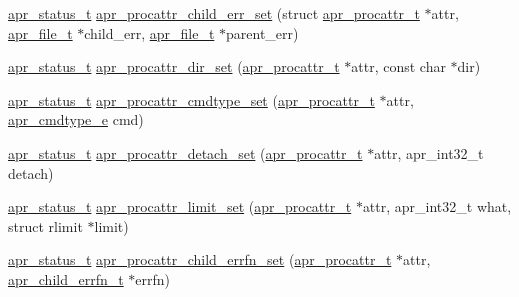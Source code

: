 \begin{DoxyCompactItemize}
\hyperlink{group__apr__errno_gaf76ee4543247e9fb3f3546203e590a6c}{apr\-\_\-status\-\_\-t} \hyperlink{group__apr__thread__proc_ga6fad364c6c820e37c0915435cfb3921f}{apr\-\_\-procattr\-\_\-child\-\_\-err\-\_\-set} (struct \hyperlink{group__apr__thread__proc_ga0d83919a6a0dd609598a864917f8b339}{apr\-\_\-procattr\-\_\-t} $\ast$attr, \hyperlink{group__apr__file__io_gaa46e4763ac375ea3c7a43ba6f6099e22}{apr\-\_\-file\-\_\-t} $\ast$child\-\_\-err, \hyperlink{group__apr__file__io_gaa46e4763ac375ea3c7a43ba6f6099e22}{apr\-\_\-file\-\_\-t} $\ast$parent\-\_\-err)
\item 
\hyperlink{group__apr__errno_gaf76ee4543247e9fb3f3546203e590a6c}{apr\-\_\-status\-\_\-t} \hyperlink{group__apr__thread__proc_ga97766f50b0ae083a2f8a28e698a59baa}{apr\-\_\-procattr\-\_\-dir\-\_\-set} (\hyperlink{group__apr__thread__proc_ga0d83919a6a0dd609598a864917f8b339}{apr\-\_\-procattr\-\_\-t} $\ast$attr, const char $\ast$dir)
\item 
\hyperlink{group__apr__errno_gaf76ee4543247e9fb3f3546203e590a6c}{apr\-\_\-status\-\_\-t} \hyperlink{group__apr__thread__proc_ga1426acc5bdd96385769e7b42bfa6ebbd}{apr\-\_\-procattr\-\_\-cmdtype\-\_\-set} (\hyperlink{group__apr__thread__proc_ga0d83919a6a0dd609598a864917f8b339}{apr\-\_\-procattr\-\_\-t} $\ast$attr, \hyperlink{group__apr__thread__proc_gadcb981d7748c580eb69ac11dbf709060}{apr\-\_\-cmdtype\-\_\-e} cmd)
\item 
\hyperlink{group__apr__errno_gaf76ee4543247e9fb3f3546203e590a6c}{apr\-\_\-status\-\_\-t} \hyperlink{group__apr__thread__proc_ga3ccca55041f648f00f0605673d4e0fdc}{apr\-\_\-procattr\-\_\-detach\-\_\-set} (\hyperlink{group__apr__thread__proc_ga0d83919a6a0dd609598a864917f8b339}{apr\-\_\-procattr\-\_\-t} $\ast$attr, apr\-\_\-int32\-\_\-t detach)
\item 
\hyperlink{group__apr__errno_gaf76ee4543247e9fb3f3546203e590a6c}{apr\-\_\-status\-\_\-t} \hyperlink{group__apr__thread__proc_ga4de85cfd54d27476dbb943955c1b0a2a}{apr\-\_\-procattr\-\_\-limit\-\_\-set} (\hyperlink{group__apr__thread__proc_ga0d83919a6a0dd609598a864917f8b339}{apr\-\_\-procattr\-\_\-t} $\ast$attr, apr\-\_\-int32\-\_\-t what, struct rlimit $\ast$limit)
\item 
\hyperlink{group__apr__errno_gaf76ee4543247e9fb3f3546203e590a6c}{apr\-\_\-status\-\_\-t} \hyperlink{group__apr__thread__proc_gaa39deba0837e0772754ad41589b733cf}{apr\-\_\-procattr\-\_\-child\-\_\-errfn\-\_\-set} (\hyperlink{group__apr__thread__proc_ga0d83919a6a0dd609598a864917f8b339}{apr\-\_\-procattr\-\_\-t} $\ast$attr, \hyperlink{group__apr__thread__proc_ga8f8642f468f05b0ac2b1426b723af100}{apr\-\_\-child\-\_\-errfn\-\_\-t} $\ast$errfn)

\end{DoxyCompactItemize}
